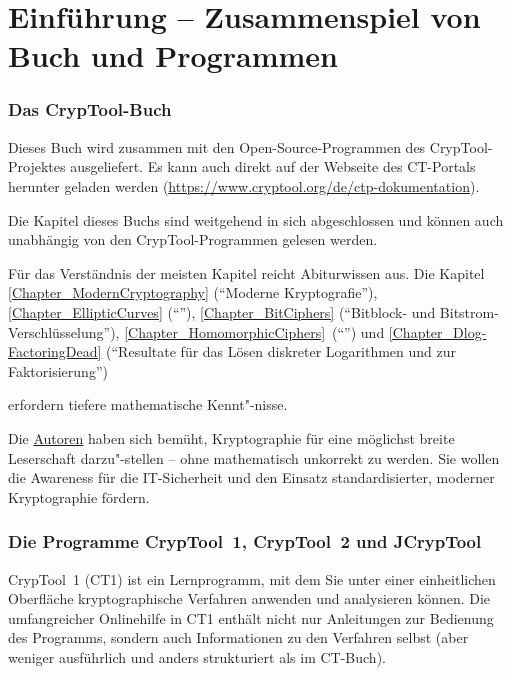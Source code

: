 \chapter{Einführung -- Zusammenspiel von Buch und Programmen}

\subsection*{Das CrypTool-Buch}

Dieses Buch wird zusammen mit den Open-Source-Programmen des CrypTool-Projektes ausgeliefert. 
Es kann auch direkt auf der Webseite des CT-Portals herunter geladen werden (\url{https://www.cryptool.org/de/ctp-dokumentation}).

Die Kapitel dieses Buchs sind weitgehend in sich abgeschlossen und können auch unabhängig von den CrypTool-Programmen gelesen werden.

Für das Verständnis der meisten Kapitel reicht Abiturwissen aus. Die Kapitel
\ref{Chapter_ModernCryptography} (\enquote{Moderne Kryptografie}), 
\ref{Chapter_EllipticCurves} (\enquote{}),
\ref{Chapter_BitCiphers} (\enquote{Bitblock- und Bitstrom-Verschlüsselung}),
\ref{Chapter_HomomorphicCiphers}~(\enquote{}) und
\ref{Chapter_Dlog-FactoringDead} (\enquote{Resultate für das Lösen diskreter Logarithmen und zur Faktorisierung}) 

erfordern tiefere mathematische Kennt"-nisse.

Die \hyperlink{appendix-authors}{Autoren} haben sich bemüht, Kryptographie für eine möglichst breite Leserschaft
darzu"-stellen -- ohne mathematisch unkorrekt zu werden. 
Sie wollen die Awareness für die IT-Sicherheit und den Einsatz standardisierter, moderner Kryptographie fördern.

\subsection*{Die Programme CrypTool~1,  CrypTool~2 und JCrypTool}

CrypTool~1 (CT1) ist ein Lernprogramm, mit dem Sie unter einer einheitlichen Oberfläche kryptographische Verfahren anwenden und analysieren können. 
Die umfangreicher Onlinehilfe in CT1 enthält nicht nur Anleitungen zur Bedienung des Programms, sondern auch Informationen zu den Verfahren selbst (aber weniger ausführlich und anders strukturiert als im CT-Buch).

